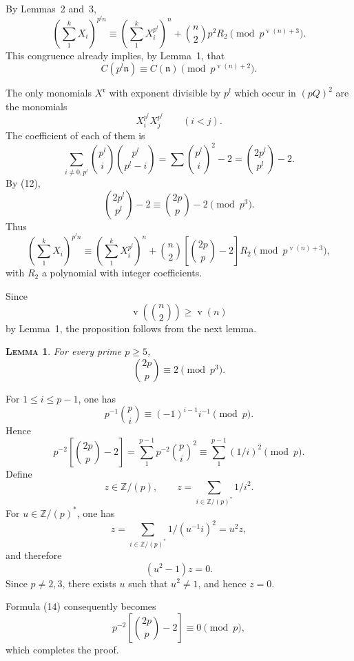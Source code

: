 \documentclass[12pt]{amsart}
\theoremstyle{plain}
\newtheorem{lem}{\textsc{Lemma}}
\DeclareMathOperator{\vord}{v}
\begin{document}
By Lemmas~2 and~3,
\begin{equation}
\left(\sum_1^k X_i\right)^{p^l n}\equiv \left(\sum_1^k X_i^{p^l}\right)^n+
\binom{n}{2}p^2R_2\pmod {p^{\vord(n)+3}}.\tag{11}
\end{equation}
This congruence already implies, by Lemma~1, that
\begin{equation}
C(p^l\mathfrak n)\equiv C(\mathfrak n)\pmod {p^{\vord(n)+2}}.\tag{12}
\end{equation}

The only monomials $X^{\mathfrak r}$ with exponent divisible by $p^l$ which occur in $(pQ)^2$ are the monomials
\[
X_i^{p^l}X_j^{p^l}\qquad (i<j).
\]
The coefficient of each of them is
\begin{equation}
\sum_{i\neq 0,p^l}\binom{p^l}{i}\binom{p^l}{p^l-i}=
\sum \binom{p^l}{i}^2-2=\binom{2p^l}{p^l}-2.\tag{13}
\end{equation}
By (12),
\[
\binom{2p^l}{p^l}-2\equiv \binom{2p}{p}-2\pmod {p^3}.
\]
Thus
\[
\left(\sum_1^k X_i\right)^{p^l n}\equiv
\left(\sum_1^k X_i^{p^l}\right)^n+
\binom{n}{2}\left[\binom{2p}{p}-2\right]R_2
\pmod {p^{\vord(n)+3}},
\]
with $R_2$ a polynomial with integer coefficients.

Since
\[
\vord\!\left(\binom{n}{2}\right)\geq \vord(n)
\]
by Lemma~1, the proposition follows from the next lemma.

\begin{lem}
For every prime $p\geq 5$,
\[
\binom{2p}{p}\equiv 2\pmod {p^3}.
\]
\end{lem}

For $1\leq i\leq p-1$, one has
\[
p^{-1}\binom{p}{i}\equiv (-1)^{i-1}i^{-1}\pmod p.
\]
Hence
\begin{equation}
p^{-2}\left[\binom{2p}{p}-2\right]
=\sum_1^{p-1} p^{-2}\binom{p}{i}^2
\equiv \sum_1^{p-1}(1/i)^2\pmod p.\tag{14}
\end{equation}
Define
\[
z\in\mathbb Z/(p),\qquad z=\sum_{i\in\mathbb Z/(p)^*}1/i^2.
\]
For $u\in\mathbb Z/(p)^*$, one has
\[
z=\sum_{i\in\mathbb Z/(p)^*}1/(u^{-1}i)^2=u^2z,
\]
and therefore
\[
(u^2-1)z=0.
\]
Since $p\neq 2,3$, there exists $u$ such that $u^2\neq 1$, and hence $z=0$.

Formula (14) consequently becomes
\[
p^{-2}\left[\binom{2p}{p}-2\right]\equiv 0\pmod p,
\]
which completes the proof.
\end{document}
